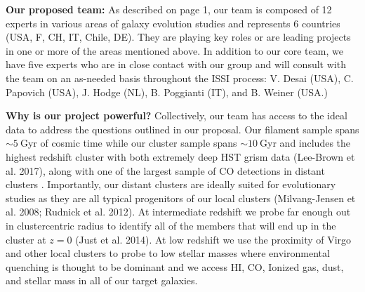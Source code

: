 \documentclass[11pt]{article}
\begin{document}

\textbf{Our proposed team:} As described on page 1, our team is composed of 12 experts in various areas of galaxy evolution studies and
represents 6 countries (USA, F, CH, IT, Chile, DE).  They are playing key roles or are leading
projects in one or more of the areas mentioned
above.   In addition to our core team, we have five experts who are in close contact with our group and will consult with the team on an as-needed basis throughout the ISSI process: V. Desai (USA), C. Papovich (USA), J. Hodge (NL), B. Poggianti (IT), and B. Weiner (USA.)

\textbf{Why is our project powerful?}   Collectively, our team has
access to the ideal data to address the questions outlined in our
proposal.  Our filament sample spans $\sim 5~$Gyr of cosmic time while our cluster sample spans $\sim10~$Gyr and
includes the highest redshift cluster with both extremely deep HST
grism data (Lee-Brown et al. 2017), along with one of the largest sample of CO detections in distant clusters \citep{Rudnick17b, Noble17}.  Importantly, our distant clusters are ideally
suited for evolutionary studies as they are all typical progenitors of
our local clusters (Milvang-Jensen et al. 2008; Rudnick et al. 2012).
At intermediate redshift we probe far enough out in clustercentric
radius to identify all of the members that will end up in the cluster
at $z=0$ (Just et al. 2014).  At low redshift we use the proximity of Virgo and other local clusters to probe to low stellar masses where environmental quenching is thought to be dominant and we access HI, CO, Ionized gas, dust, and stellar mass in all of our target galaxies. 
\end{document}
